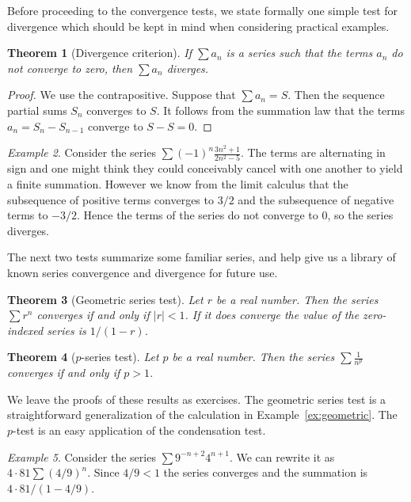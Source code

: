 \documentclass[11pt,oneside]{amsbook}
\theoremstyle{definition}
\theoremstyle{plain}
\newtheorem{thm}{Theorem}[section]
\theoremstyle{definition}
\theoremstyle{remark}
\newtheorem{example}[thm]{Example}
\numberwithin{equation}{section}
\numberwithin{figure}{section}
\begin{document}
Before proceeding to the convergence tests, we state formally one simple test for divergence which should be kept in mind when considering practical examples.

\begin{thm}[Divergence criterion]
  If $\sum a_n$ is a series such that the terms $a_n$ do not converge to zero, then $\sum a_n$ diverges.
\end{thm}

\begin{proof}
  We use the contrapositive. Suppose that $\sum a_n=S$. Then the sequence partial sums $S_n$ converges to $S$. It follows from the summation law that the terms $a_n=S_n-S_{n-1}$ converge to $S-S=0$.
\end{proof}

\begin{example}
  Consider the series $\sum(-1)^n\frac{3n^2+1}{2n^2-5}$. The terms are alternating in sign and one might think they could conceivably cancel with one another to yield a finite summation. However we know from the limit calculus that the subsequence of positive terms converges to $3/2$ and the subsequence of negative terms to $-3/2$. Hence the terms of the series do not converge to $0$, so the series diverges.
\end{example}

The next two tests summarize some familiar series, and help give us a library of known series convergence and divergence for future use.

\begin{thm}[Geometric series test]
  Let $r$ be a real number. Then the series $\sum r^n$ converges if and only if $|r|<1$. If it does converge the value of the zero-indexed series is $1/(1-r)$.
\end{thm}

\begin{thm}[$p$-series test]
  Let $p$ be a real number. Then the series $\sum \frac{1}{n^p}$ converges if and only if $p>1$.
\end{thm}

We leave the proofs of these results as exercises. 
The geometric series test is a straightforward generalization of the calculation in Example~\ref{ex:geometric}. The $p$-test is an easy application of the condensation test.

\begin{example}
  Consider the series $\sum 9^{-n+2}4^{n+1}$. We can rewrite it as $4\cdot81\sum(4/9)^n$. Since $4/9<1$ the series converges and the summation is $4\cdot81/(1-4/9)$.
\end{example}
\end{document}
